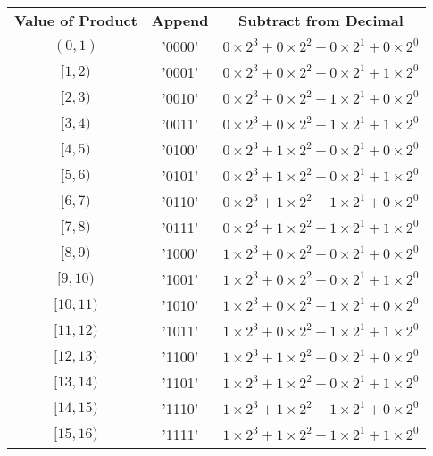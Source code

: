 \documentclass[12pt]{article}
\begin{document}
\begin{center}
\begin{tabular}{c|c|c}
    \textbf{Value of Product} & \textbf{Append} & \textbf{Subtract from Decimal} \\
    $(0,1)$   & '0000' & $0\times2^3 + 0\times2^2 + 0\times2^1 + 0\times2^0$ \\
    $[1,2)$   & '0001' & $0\times2^3 + 0\times2^2 + 0\times2^1 + 1\times2^0$ \\
    $[2,3)$   & '0010' & $0\times2^3 + 0\times2^2 + 1\times2^1 + 0\times2^0$ \\
    $[3,4)$   & '0011' & $0\times2^3 + 0\times2^2 + 1\times2^1 + 1\times2^0$ \\
    $[4,5)$   & '0100' & $0\times2^3 + 1\times2^2 + 0\times2^1 + 0\times2^0$ \\
    $[5,6)$   & '0101' & $0\times2^3 + 1\times2^2 + 0\times2^1 + 1\times2^0$ \\
    $[6,7)$   & '0110' & $0\times2^3 + 1\times2^2 + 1\times2^1 + 0\times2^0$ \\
    $[7,8)$   & '0111' & $0\times2^3 + 1\times2^2 + 1\times2^1 + 1\times2^0$ \\
    $[8,9)$   & '1000' & $1\times2^3 + 0\times2^2 + 0\times2^1 + 0\times2^0$ \\
    $[9,10)$  & '1001' & $1\times2^3 + 0\times2^2 + 0\times2^1 + 1\times2^0$ \\
    $[10,11)$ & '1010' & $1\times2^3 + 0\times2^2 + 1\times2^1 + 0\times2^0$ \\
    $[11,12)$ & '1011' & $1\times2^3 + 0\times2^2 + 1\times2^1 + 1\times2^0$ \\
    $[12,13)$ & '1100' & $1\times2^3 + 1\times2^2 + 0\times2^1 + 0\times2^0$ \\
    $[13,14)$ & '1101' & $1\times2^3 + 1\times2^2 + 0\times2^1 + 1\times2^0$ \\
    $[14,15)$ & '1110' & $1\times2^3 + 1\times2^2 + 1\times2^1 + 0\times2^0$ \\
    $[15,16)$ & '1111' & $1\times2^3 + 1\times2^2 + 1\times2^1 + 1\times2^0$
\end{tabular}
\end{center}
\end{document}
